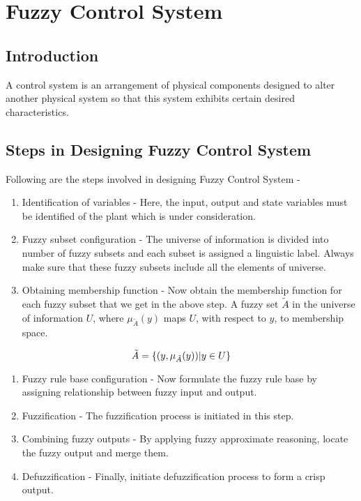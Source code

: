 \hypertarget{fuzzy-control-system}{%
\chapter{Fuzzy Control System}\label{fuzzy-control-system}}
\section{Introduction}
A control system is an arrangement of physical components designed to
alter another physical system so that this system exhibits certain
desired characteristics.

\hypertarget{steps-in-designing-fuzzy-control-system}{%
\section{Steps in Designing Fuzzy Control
System}\label{steps-in-designing-fuzzy-control-system}}

Following are the steps involved in designing Fuzzy Control System -

\begin{enumerate}
\def\labelenumi{\arabic{enumi}.}
\item
  Identification of variables - Here, the input, output and state
  variables must be identified of the plant which is under
  consideration.
\item
  Fuzzy subset configuration - The universe of information is divided
  into number of fuzzy subsets and each subset is assigned a linguistic
  label. Always make sure that these fuzzy subsets include all the
  elements of universe.
\item
  Obtaining membership function - Now obtain the membership function for
  each fuzzy subset that we get in the above step. A fuzzy set
  \(\tilde{A}\) in the universe of information \(U\), where
  \(\mu_{\tilde{A}}(y)\) maps \(U\), with respect to \(y\), to
  membership space.
\end{enumerate}
\[
\Large\tilde{A} = \{(y,\mu_{\tilde{A}}(y)) | y \in U\}
\]

\begin{enumerate}
\def\labelenumi{\arabic{enumi}.}
\setcounter{enumi}{3}
\item
  Fuzzy rule base configuration - Now formulate the fuzzy rule base by
  assigning relationship between fuzzy input and output.
\item
  Fuzzification - The fuzzification process is initiated in this step.
\item
  Combining fuzzy outputs - By applying fuzzy approximate reasoning,
  locate the fuzzy output and merge them.
\item
  Defuzzification - Finally, initiate defuzzification process to form a
  crisp output.
\end{enumerate}
